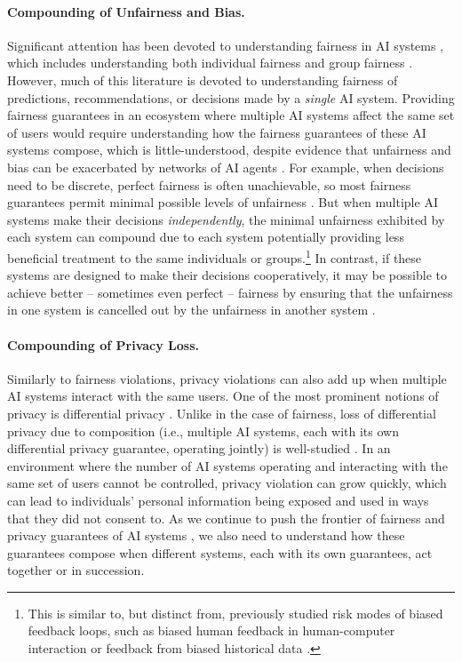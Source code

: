 \paragraph{Compounding of Unfairness and Bias.}
Significant attention has been devoted to understanding fairness in AI systems \citep{mehrabi2021survey}, which includes understanding both individual fairness \citep{zemel2013learning,balcan2019envy,hossain2021fair} and group fairness \citep{hardt2016equality,haghtalab2022demand,hossain2020designing,micha2020proportionally,aziz2023group}.
However, much of this literature is devoted to understanding fairness of predictions, recommendations, or decisions made by a \emph{single} AI system.
Providing fairness guarantees in an ecosystem where multiple AI systems affect the same set of users would require understanding how the fairness guarantees of these AI systems compose, which is little-understood, despite evidence that unfairness and bias can be exacerbated by networks of AI agents \citep{Acerbi2023}.
For example, when decisions need to be discrete, perfect fairness is often unachievable, so most fairness guarantees permit minimal possible levels of unfairness \citep{amanatidis2022fair}.
But when multiple AI systems make their decisions \emph{independently}, the minimal unfairness exhibited by each system can compound due to each system potentially providing less beneficial treatment to the same individuals or groups.\footnote{This is similar to, but distinct from, previously studied risk modes of biased feedback loops, such as biased human feedback in human-computer interaction or feedback from biased historical data \citep{devillers2021ai}.}
In contrast, if these systems are designed to make their decisions cooperatively, it may be possible to achieve better -- sometimes even perfect -- fairness by ensuring that the unfairness in one system is cancelled out by the unfairness in another system \citep{zhang2014fairness,aziz2023best}. 

\paragraph{Compounding of Privacy Loss.}
Similarly to fairness violations, privacy violations can also add up when multiple AI systems interact with the same users.
One of the most prominent notions of privacy is differential privacy \citep{dwork2006differential}.
Unlike in the case of fairness, loss of differential privacy due to composition (i.e., multiple AI systems, each with its own differential privacy guarantee, operating jointly) is well-studied \citep{kairouz2015composition,lyu2022composition}.
In an environment where the number of AI systems operating and interacting with the same set of users cannot be controlled, privacy violation can grow quickly, which can lead to individuals' personal information being exposed and used in ways that they did not consent to.
As we continue to push the frontier of fairness and privacy guarantees of AI systems \citep{shah2023pushing,zhao2022survey}, we also need to understand how these guarantees compose when different systems, each with its own guarantees, act together or in succession. 

